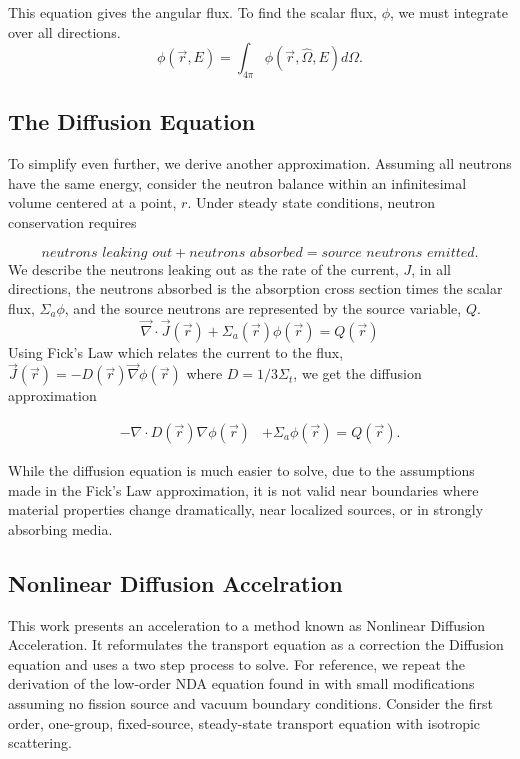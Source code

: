 This equation gives the angular flux. To find the scalar flux, $\phi$, we must integrate over all directions.
\begin{equation}
    \phi(\vec{r}, E) = \int_{4\pi} \phi(\vec{r}, \hat{\Omega}, E) d \Omega.
\end{equation}

\subsection{The Diffusion Equation}
To simplify even further, we derive another approximation. Assuming all neutrons have the same energy, consider the neutron balance within an infinitesimal volume centered at a point, $r$. Under steady state conditions, neutron conservation requires

\begin{equation}
    \textit{neutrons leaking out} + \textit{neutrons absorbed} = \textit{source neutrons emitted}.
\end{equation}
We describe the neutrons leaking out as the rate of the current, $J$, in all directions, the neutrons absorbed is the absorption cross section times the scalar flux, $\Sigma_a\phi$, and the source neutrons are represented by the source variable, $Q$. 
\begin{equation}
    \vec{\nabla}\cdot \vec{J}(\vec{r}) + \Sigma_a(\vec{r})\phi(\vec{r}) = Q(\vec{r})
\end{equation}
Using Fick's Law which relates the current to the flux, $\vec{J}(\vec{r}) = -D(\vec{r})\vec{\nabla}\phi(\vec{r})$ where $D = 1/3\Sigma_t$, we get the diffusion approximation

\begin{equation}
\begin{split}
 - \nabla \cdot D(\vec{r})\nabla\phi(\vec{r}) &+ \Sigma_a \phi(\vec{r}) = Q(\vec{r}).
\end{split}
\label{eq:diffusion_fixed_source}
\end{equation}

While the diffusion equation is much easier to solve, due to the assumptions made in the Fick's Law approximation, it is not valid near boundaries where material properties change dramatically, near localized sources, or in strongly absorbing media. 

\subsection{Nonlinear Diffusion Accelration}
This work presents an acceleration to a method known as Nonlinear Diffusion Acceleration. It reformulates the transport equation as a correction the Diffusion equation and uses a two step process to solve. For reference, we repeat the derivation of the low-order NDA equation found in \cite{morel-holo} with small modifications assuming no fission source and vacuum boundary conditions. Consider the first order, one-group, fixed-source, steady-state \sn transport equation with isotropic scattering. 

